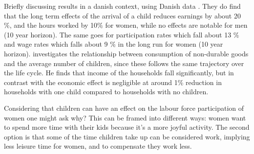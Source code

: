 Briefly discussing results in a danish context, using Danish data \textcite{kleven_children_2019}. They do find that the long term effects of the arrival of a child reduces earnings by about 20 \%, and the hours worked by 10\% for women, while no effects are notable for men (10 year horizon). The same goes for participation rates which fall about 13 \% and wage rates which falls about 9 \% in the long run for women (10 year horizon). \textcite{jorgensen_life-cycle_2017} investigates the relationship between consumption of non-durable goods and the average number of children, since these follows the same trajectory over the life cycle. He finds that income of the households fall significantly, but in contrast with \textcite{kleven_children_2019} the economic effect is negligible at around 1\% reduction in households with one child compared to households with no children. 

Considering that children can have an effect on the labour force participation of women one might ask why? This can be framed into different ways: women want to spend more time with their kids because it's a more joyful activity. The second option is that some of the time children take up can be considered work, implying less leisure time for women, and to compensate they work less. 